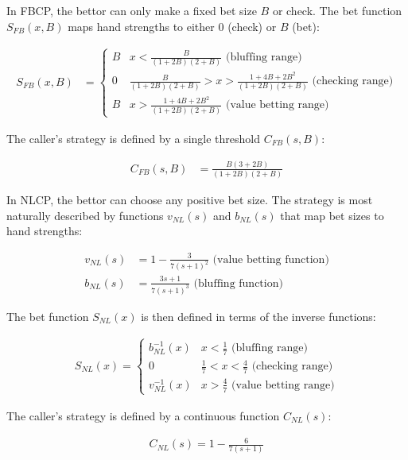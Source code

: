 \documentclass[../../main/main.tex]{subfiles}
\begin{document}
In FBCP, the bettor can only make a fixed bet size $B$ or check. The bet function $S_{FB}(x, B)$ maps hand strengths to either $0$ (check) or $B$ (bet):

\begin{align}
	S_{FB}(x, B) & = \begin{cases}
    B & x < \frac{B}{(1+2B)(2+B)} \text{ (bluffing range)}\\
    0 & \frac{B}{(1+2B)(2+B)} > x > \frac{1 + 4B + 2B^2}{(1+2B)(2+B)} \text{ (checking range)}\\
    B & x > \frac{1 + 4B + 2B^2}{(1+2B)(2+B)} \text{ (value betting range)}
\end{cases}
\end{align}

The caller's strategy is defined by a single threshold $C_{FB}(s, B)$:

\begin{align}
C_{FB}(s, B) & = \frac{B(3 +2B)}{(1+2B)(2+B)}
\end{align}

In NLCP, the bettor can choose any positive bet size. The strategy is most naturally described by functions $v_{NL}(s)$ and $b_{NL}(s)$ that map bet sizes to hand strengths:

\begin{align*}
    v_{NL}(s) &= 1 - \frac{3}{7(s+1)^2} \text{ (value betting function)} \\
    b_{NL}(s) &= \frac{3s+1}{7(s+1)^3} \text{ (bluffing function)}
\end{align*}

The bet function $S_{NL}(x)$ is then defined in terms of the inverse functions:

\begin{align*}
    S_{NL}(x) = \begin{cases}
        b_{NL}^{-1}(x) & x < \frac{1}{7} \text{ (bluffing range)} \\
        0 & \frac{1}{7} < x < \frac{4}{7} \text{ (checking range)} \\
        v_{NL}^{-1}(x) & x > \frac{4}{7} \text{ (value betting range)}
    \end{cases}
\end{align*}

The caller's strategy is defined by a continuous function $C_{NL}(s)$:

\begin{align*}
    C_{NL}(s) = 1 - \frac{6}{7 (s+1)}
\end{align*}
\end{document}
